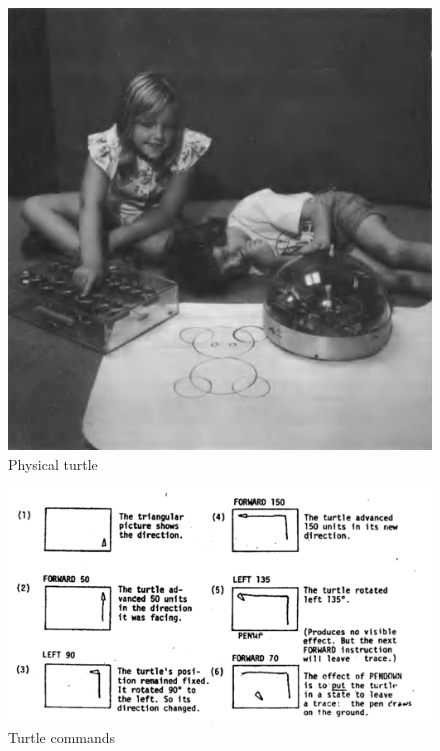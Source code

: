 \clearpage
\begin{figure}
    \includegraphics[max width=\textwidth]{images/turtle.png}
    \caption[Physical turtle]{Physical turtle \parencite[ii]{papertMindstormsChildrenComputers1980}}
    \label{fig:turtle-commands}
  \end{figure}
  \clearpage
  \begin{figure}
    \includegraphics[max width=\textwidth]{images/turtle-commands.png} 
    \caption[Turtle commands]{Turtle commands \parencite[827]{solomonHistoryLogo2020a}}
    \label{fig:turtle-commands}
  \end{figure}
  \clearpage

